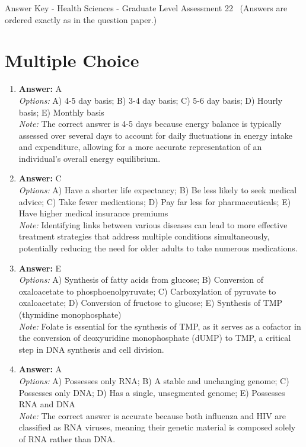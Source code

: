\documentclass[12pt]{article}
\begin{document}
\begin{center}
Answer Key - Health Sciences - Graduate Level Assessment 22 \
\small (Answers are ordered exactly as in the question paper.)
\end{center}

\section*{Multiple Choice}
\begin{enumerate}[label=\arabic*.]
\item \textbf{Answer:} A
\\ \textit{Options:} A) 4-5 day basis; B) 3-4 day basis; C) 5-6 day basis; D) Hourly basis; E) Monthly basis
\\ \textit{Note:} The correct answer is 4-5 days because energy balance is typically assessed over several days to account for daily fluctuations in energy intake and expenditure, allowing for a more accurate representation of an individual's overall energy equilibrium.
\item \textbf{Answer:} C
\\ \textit{Options:} A) Have a shorter life expectancy; B) Be less likely to seek medical advice; C) Take fewer medications; D) Pay far less for pharmaceuticals; E) Have higher medical insurance premiums
\\ \textit{Note:} Identifying links between various diseases can lead to more effective treatment strategies that address multiple conditions simultaneously, potentially reducing the need for older adults to take numerous medications.
\item \textbf{Answer:} E
\\ \textit{Options:} A) Synthesis of fatty acids from glucose; B) Conversion of oxaloacetate to phosphoenolpyruvate; C) Carboxylation of pyruvate to oxaloacetate; D) Conversion of fructose to glucose; E) Synthesis of TMP (thymidine monophosphate)
\\ \textit{Note:} Folate is essential for the synthesis of TMP, as it serves as a cofactor in the conversion of deoxyuridine monophosphate (dUMP) to TMP, a critical step in DNA synthesis and cell division.
\item \textbf{Answer:} A
\\ \textit{Options:} A) Possesses only RNA; B) A stable and unchanging genome; C) Possesses only DNA; D) Has a single, unsegmented genome; E) Possesses RNA and DNA
\\ \textit{Note:} The correct answer is accurate because both influenza and HIV are classified as RNA viruses, meaning their genetic material is composed solely of RNA rather than DNA.

\end{enumerate}
\end{document}
